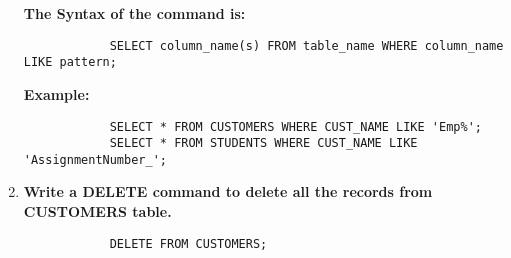 \documentclass[11pt]{article}
\begin{document}
\begin{enumerate}
	      \textbf{The Syntax of the command is:}
	      \begin{verbatim}
			SELECT column_name(s) FROM table_name WHERE column_name LIKE pattern;
		\end{verbatim}

	      \textbf{Example:}
	      \begin{verbatim}
			SELECT * FROM CUSTOMERS WHERE CUST_NAME LIKE 'Emp%';
			SELECT * FROM STUDENTS WHERE CUST_NAME LIKE 'AssignmentNumber_';
		\end{verbatim}


	\item \textbf{Write a DELETE command to delete all the records from CUSTOMERS table.}

	      \begin{verbatim}
			DELETE FROM CUSTOMERS;
		\end{verbatim}
\end{enumerate}
\end{document}
